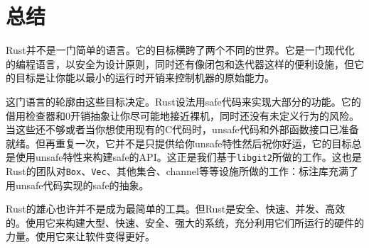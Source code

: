\section{总结}
Rust并不是一门简单的语言。它的目标横跨了两个不同的世界。它是一门现代化的编程语言，以安全为设计原则，同时还有像闭包和迭代器这样的便利设施，但它的目标是让你能以最小的运行时开销来控制机器的原始能力。

这门语言的轮廓由这些目标决定。Rust设法用safe代码来实现大部分的功能。它的借用检查器和0开销抽象让你尽可能地接近裸机，同时还没有未定义行为的风险。当这些还不够或者当你想使用现有的C代码时，unsafe代码和外部函数接口已准备就绪。但再重复一次，它并不是只提供给你unsafe特性然后祝你好运，它的目标总是使用unsafe特性来构建safe的API。这正是我们基于\texttt{libgit2}所做的工作。这也是Rust的团队对\texttt{Box}、\texttt{Vec}、其他集合、channel等等设施所做的工作：标注库充满了用unsafe代码实现的safe的抽象。

Rust的雄心也许并不是成为最简单的工具。但Rust是安全、快速、并发、高效的。使用它来构建大型、快速、安全、强大的系统，充分利用它们所运行的硬件的力量。使用它来让软件变得更好。

